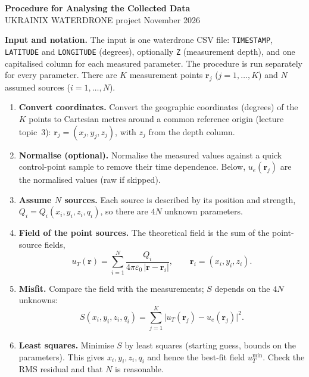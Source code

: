 \documentclass{article}
\begin{document}
\begin{center}
{\Large\bfseries Procedure for Analysing the Collected Data}\\[1mm]
UKRAINIX WATERDRONE project  November 2026
\end{center}

\noindent\textbf{Input and notation.} The input is one waterdrone CSV file:
\texttt{TIMESTAMP}, \texttt{LATITUDE} and \texttt{LONGITUDE} (degrees),
optionally \texttt{Z} (measurement depth), and one capitalised column for each
measured parameter. The procedure is run separately for every parameter.
There are $K$ measurement points $\mathbf r_j$ ($j=1,\dots,K$) and $N$ assumed
sources ($i=1,\dots,N$).

\begin{enumerate}
\item \textbf{Convert coordinates.} Convert the geographic coordinates
      (degrees) of the $K$ points to Cartesian metres around a common
      reference origin (lecture topic~3): $\mathbf r_j=(x_j,y_j,z_j)$, with
      $z_j$ from the depth column.

\item \textbf{Normalise (optional).} Normalise the measured values against
      a quick control-point sample to remove their time dependence. Below,
      $u_e(\mathbf r_j)$ are the normalised values (raw if skipped).

\item \textbf{Assume $N$ sources.} Each source is described by its position
      and strength, $Q_i=Q_i(x_i,y_i,z_i,q_i)$, so there are $4N$ unknown
      parameters.

\item \textbf{Field of the point sources.} The theoretical field is the sum of
      the point-source fields,
      \[
        u_T(\mathbf r)=\sum_{i=1}^{N}\frac{Q_i}{4\pi\varepsilon_0\,
        |\mathbf r-\mathbf r_i|},\qquad \mathbf r_i=(x_i,y_i,z_i).
      \]

\item \textbf{Misfit.} Compare the field with the measurements; $S$ depends
      on the $4N$ unknowns:
      \[
        S(x_i,y_i,z_i,q_i)=\sum_{j=1}^{K}
        \bigl|u_T(\mathbf r_j)-u_e(\mathbf r_j)\bigr|^{2}.
      \]

\item \textbf{Least squares.} Minimise $S$ by least squares (starting guess,
      bounds on the parameters). This gives $x_i,y_i,z_i,q_i$ and hence the
      best-fit field $u_{T}^{\min}$. Check the RMS residual and that $N$ is
      reasonable.


\end{enumerate}
\end{document}
